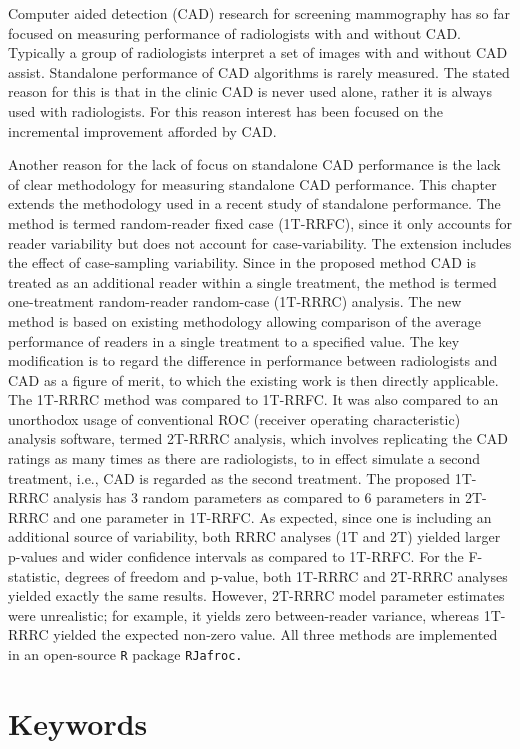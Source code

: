 \documentclass[
]{book}
\begin{document}
Computer aided detection (CAD) research for screening mammography has so far focused on measuring performance of radiologists with and without CAD. Typically a group of radiologists interpret a set of images with and without CAD assist. Standalone performance of CAD algorithms is rarely measured. The stated reason for this is that in the clinic CAD is never used alone, rather it is always used with radiologists. For this reason interest has been focused on the incremental improvement afforded by CAD.

Another reason for the lack of focus on standalone CAD performance is the lack of clear methodology for measuring standalone CAD performance. This chapter extends the methodology used in a recent study of standalone performance. The method is termed random-reader fixed case (1T-RRFC), since it only accounts for reader variability but does not account for case-variability. The extension includes the effect of case-sampling variability. Since in the proposed method CAD is treated as an additional reader within a single treatment, the method is termed one-treatment random-reader random-case (1T-RRRC) analysis. The new method is based on existing methodology allowing comparison of the average performance of readers in a single treatment to a specified value. The key modification is to regard the difference in performance between radiologists and CAD as a figure of merit, to which the existing work is then directly applicable. The 1T-RRRC method was compared to 1T-RRFC. It was also compared to an unorthodox usage of conventional ROC (receiver operating characteristic) analysis software, termed 2T-RRRC analysis, which involves replicating the CAD ratings as many times as there are radiologists, to in effect simulate a second treatment, i.e., CAD is regarded as the second treatment. The proposed 1T-RRRC analysis has 3 random parameters as compared to 6 parameters in 2T-RRRC and one parameter in 1T-RRFC. As expected, since one is including an additional source of variability, both RRRC analyses (1T and 2T) yielded larger p-values and wider confidence intervals as compared to 1T-RRFC. For the F-statistic, degrees of freedom and p-value, both 1T-RRRC and 2T-RRRC analyses yielded exactly the same results. However, 2T-RRRC model parameter estimates were unrealistic; for example, it yields zero between-reader variance, whereas 1T-RRRC yielded the expected non-zero value. All three methods are implemented in an open-source \texttt{R} package \texttt{RJafroc.}

\hypertarget{standalone-cad-radiologists-ker-words}{%
\section{Keywords}\label{standalone-cad-radiologists-ker-words}}
\end{document}
